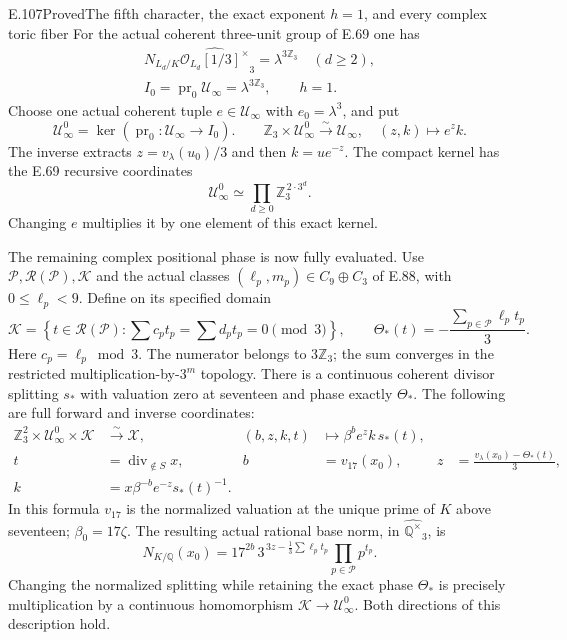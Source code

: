 \begin{statement}{E.107}{Proved}{The fifth character, the exact exponent \(h=1\), and every complex toric fiber}
For the actual coherent three-unit group of E.69 one has
\[
 \begin{gathered}
 N_{L_d/K}\widehat{\mathcal O_{L_d}[1/3]^\times}_3
       =\lambda^{3\mathbb Z_3}\quad(d\ge2),\\
 I_0=\operatorname{pr}_0\mathcal U_\infty
       =\lambda^{3\mathbb Z_3},\qquad h=1 .
 \end{gathered}
 \tag{E107.7}
\]
Choose one actual coherent tuple
\(e\in\mathcal U_\infty\) with \(e_0=\lambda^3\), and put
\[
 \mathcal U_\infty^0=\ker(\operatorname{pr}_0:\mathcal U_\infty\to I_0).
 \qquad
 \mathbb Z_3\times\mathcal U_\infty^0
    \xrightarrow{\sim}\mathcal U_\infty,\quad(z,k)\longmapsto e^z k .
 \tag{E107.8}
\]
The inverse extracts \(z=v_\lambda(u_0)/3\) and then \(k=u e^{-z}\).
The compact kernel has the E.69 recursive coordinates
\[
                  \mathcal U_\infty^0
          \simeq\prod_{d\ge0}\mathbb Z_3^{\,2\cdot3^d}.
 \tag{E107.9}
\]
Changing \(e\) multiplies it by one element of this exact kernel.

The remaining complex positional phase is now fully evaluated.
Use \(\mathcal P,\mathscr R(\mathcal P),\mathcal K\) and the actual
classes \((\ell_p,m_p)\in C_9\oplus C_3\) of E.88, with
\(0\le\ell_p<9\). Define on its specified domain
\[
 \mathcal K=\left\{t\in\mathscr R(\mathcal P):
     \sum c_pt_p=\sum d_pt_p=0\pmod3\right\},\qquad
 \Theta_*(t)=-\frac{\sum_{p\in\mathcal P}\ell_pt_p}{3}.
 \tag{E107.10}
\]
Here \(c_p=\ell_p\bmod3\). The numerator belongs to \(3\mathbb Z_3\);
the sum converges in the restricted multiplication-by-\(3^m\)
topology. There is a continuous coherent divisor splitting \(s_*\)
with valuation zero at seventeen and phase exactly \(\Theta_*\).
The following are full forward and inverse coordinates:
\[
 \begin{aligned}
 \mathbb Z_3^2\times\mathcal U_\infty^0\times\mathcal K
      &\xrightarrow{\sim}\mathcal X,&
 (b,z,k,t)&\longmapsto\beta^b e^z k\,s_*(t),\\
 t&=\operatorname{div}_{\notin S}x,&
 b&=v_{17}(x_0),&
 z&=\frac{v_\lambda(x_0)-\Theta_*(t)}3,\\
 k&=x\beta^{-b}e^{-z}s_*(t)^{-1}.&&&
 \end{aligned}
 \tag{E107.11}
\]
In this formula \(v_{17}\) is the normalized valuation at the unique
prime of \(K\) above seventeen; \(\beta_0=17\zeta\).
The resulting actual rational base norm, in
\(\widehat{\mathbb Q^\times}_3\), is
\[
 N_{K/\mathbb Q}(x_0)
       =17^{2b}\,3^{\,3z-\frac13\sum\ell_pt_p}
                      \prod_{p\in\mathcal P}p^{t_p}.
 \tag{E107.12}
\]
Changing the normalized splitting while retaining the exact phase
\(\Theta_*\) is precisely multiplication by a continuous homomorphism
\(\mathcal K\to\mathcal U_\infty^0\). Both directions of this
description hold.


\end{statement}
